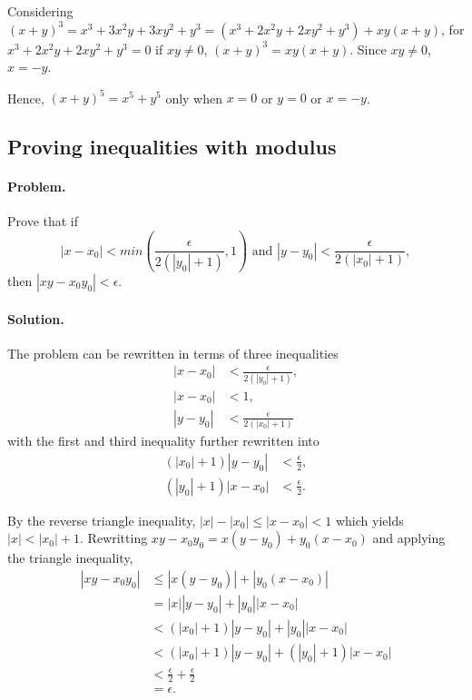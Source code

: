 \documentclass{article}
\begin{document}
Considering $(x + y)^3 = x^3 + 3x^2y + 3xy^2 + y^3 = (x^3 + 2x^2y + 2xy^2 + y^3) + xy(x + y)$, for $x^3 + 2x^2y + 2xy^2 + y^3 = 0$ if $xy \neq 0$, $(x + y)^3 = xy(x + y)$. Since $xy \neq 0$, $x = -y$.

Hence, $(x + y)^5 = x^5 + y^5$ only when $x = 0$ or $y = 0$ or $x = -y$.

\setcounter{subsection}{20}
\subsection{Proving inequalities with modulus}

\paragraph{Problem.} Prove that if \begin{equation*}
  |x - x_0| < min\left(\frac{\epsilon}{2(|y_0| + 1)}, 1\right) \text{ and } |y - y_0| < \frac{\epsilon}{2(|x_0| + 1)},
\end{equation*} then $|xy - x_0y_0| < \epsilon$.

\paragraph{Solution.} The problem can be rewritten in terms of three inequalities \begin{align*}
  |x - x_0| &< \frac{\epsilon}{2(|y_0| + 1)}, \\
  |x - x_0| &< 1, \\
  |y - y_0| &< \frac{\epsilon}{2(|x_0| + 1)}
\end{align*} with the first and third inequality further rewritten into \begin{align*}
  (|x_0| + 1)|y - y_0| &< \frac{\epsilon}{2}, \\
  (|y_0| + 1)|x - x_0| &< \frac{\epsilon}{2}.
\end{align*}

By the reverse triangle inequality, $|x| - |x_0| \leq |x - x_0| < 1$ which yields $|x| < |x_0| + 1$. Rewritting $xy - x_0y_0 = x(y - y_0) + y_0(x - x_0)$ and applying the triangle inequality, \begin{align*}
  |xy - x_0y_0| &\leq |x(y - y_0)| + |y_0(x - x_0)| \\
                &= |x||y - y_0| + |y_0||x - x_0| \\
                &< (|x_0| + 1)|y - y_0| + |y_0||x - x_0| \\
                &< (|x_0| + 1)|y - y_0| + (|y_0| + 1)|x - x_0| \\
                &< \frac{\epsilon}{2} + \frac{\epsilon}{2} \\
                &= \epsilon.
\end{align*}
\end{document}
